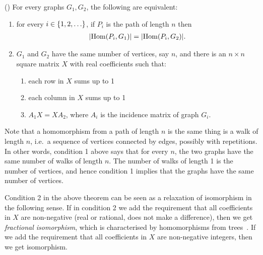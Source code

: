 \begin{theorem}\label{thm:grohe}(\cite[Theorem 2]{groheDellRattan2018})
    For every  graphs $G_1,G_2$, the following  are equivalent:
    \begin{enumerate}
        \item for every $i \in \{1,2,\ldots\}$, if $P_i$ is the path of length $n$ then
        \begin{align*}
        |\mathrm {Hom}(P_i,G_1) | = |\mathrm {Hom}(P_i,G_2)|.
        \end{align*}
        \item $G_1$ and $G_2$  have the same number of vertices, say $n$, and there is an $n \times n$ square matrix $X$ with real coefficients such that:
        \begin{enumerate}
            \item each row in $X$ sums up to 1
            \item each column in $X$ sums up to 1
            \item $A_1 X = X A_2$, where $A_i$ is the incidence matrix of graph $G_i$.
        \end{enumerate}
    \end{enumerate}
\end{theorem}
Note that a homomorphism from a path of length $n$ is the same thing is a walk of length $n$, i.e.~a sequence of vertices connected by edges, possibly with repetitions.  In other words, condition 1 above says that for every $n$, the two graphs have the same number of walks of length $n$. The number of walks of length 1 is the number of vertices, and hence condition 1 implies that the graphs have the same number of vertices.     

Condition 2 in the above theorem can be seen as a relaxation of isomorphism in the following sense. 
If in condition 2 we add the requirement that all coefficients in $X$ are non-negative (real or rational, does not make a difference), then we get  \emph{fractional isomorphism}, which is characterised by homomorphisms from trees~\cite[Theorem 1]{groheDellRattan2018}. If we add the requirement that all coefficients in $X$ are non-negative integers, then we get isomorphism.  

